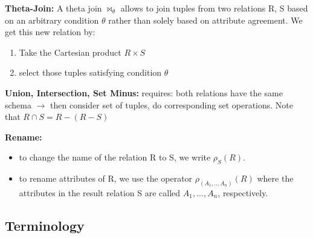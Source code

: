 \documentclass[11pt,oneside,a4paper]{article}
\begin{document}
\textbf{Theta-Join:} A theta join $\bowtie_\theta$ allows to join tuples from two relations R, S based on an arbitrary condition $\theta$ rather than solely based on attribute agreement. We get this new relation by:

\vspace{-\topsep}
\begin{enumerate}
	\setlength{\itemsep}{0pt}
	\setlength{\parskip}{0pt}
	\item Take the Cartesian product $R \times S$
	\item select those tuples satisfying condition $\theta$
\end{enumerate}
\vspace{-\topsep}

\textbf{Union, Intersection, Set Minus:} requires: both relations have the same schema $\rightarrow$ then consider set of tuples, do corresponding set operations. Note that $R \cap S = R - (R - S)$

\textbf{Rename:} 

\vspace{-\topsep}
\begin{itemize}
	\setlength{\itemsep}{0pt}
	\setlength{\parskip}{0pt}
	\item to change the name of the relation R to S, we write $\rho_S(R)$. 
	\item to rename attributes of R, we use the operator $\rho_{(A_1,..,A_n)}(R)$ where the attributes in the result relation S are called $A_1,...,A_n$, respectively.
\end{itemize}
\vspace{-\topsep}

\subsection{Terminology}
\end{document}
